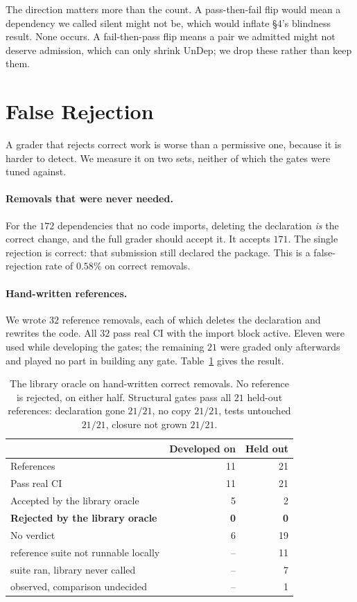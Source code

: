 The direction matters more than the count. A pass-then-fail flip would
mean a dependency we called silent might not be, which would inflate
\S4's blindness result. None occurs. A fail-then-pass flip means a pair
we admitted might not deserve admission, which can only shrink UnDep;
we drop these rather than keep them.

\section{False Rejection}
\label{app:false-rejection}

A grader that rejects correct work is worse than a permissive one,
because it is harder to detect. We measure it on two sets, neither of
which the gates were tuned against.

\paragraph{Removals that were never needed.}
For the $172$ dependencies that no code imports, deleting the
declaration \emph{is} the correct change, and the full grader should
accept it. It accepts $171$. The single rejection is correct: that
submission still declared the package. This is a false-rejection rate
of $0.58\%$ on correct removals.

\paragraph{Hand-written references.}
We wrote $32$ reference removals, each of which deletes the declaration
and rewrites the code. All $32$ pass real CI with the import block
active. Eleven were used while developing the gates; the remaining $21$
were graded only afterwards and played no part in building any gate.
Table~\ref{tab:references} gives the result.

\begin{table}[t]
\centering\small
\begin{tabular}{@{}lrr@{}}
\toprule
 & Developed on & Held out \\
\midrule
References & 11 & 21 \\
Pass real CI & 11 & 21 \\
\midrule
Accepted by the library oracle & 5 & 2 \\
\textbf{Rejected by the library oracle} & \textbf{0} & \textbf{0} \\
No verdict & 6 & 19 \\
\quad reference suite not runnable locally & -- & 11 \\
\quad suite ran, library never called & -- & 7 \\
\quad observed, comparison undecided & -- & 1 \\
\bottomrule
\end{tabular}
\caption{The library oracle on hand-written correct removals. No
reference is rejected, on either half. Structural gates pass all $21$
held-out references: declaration gone $21/21$, no copy $21/21$, tests
untouched $21/21$, closure not grown $21/21$.}
\label{tab:references}
\end{table}

